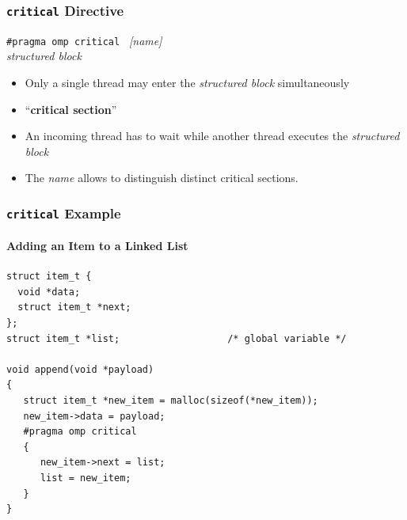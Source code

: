 \documentclass{beamer}
\begin{document}
\begin{frame}
  \frametitle{\texttt{critical} Directive} 

\begin{framed}
  {\tt \#pragma omp critical } {\it [name]}  \\
  {\it structured block} 
\end{framed}

\bigskip

\begin{itemize}
\item Only a single thread may enter the \textit{structured block} simultaneously

\item ``\textbf{critical section}''
    
\item An incoming thread has to wait while another thread executes the \textit{structured block}
  
\item The \textit{name} allows to distinguish distinct critical sections.
\end{itemize}
\end{frame}


\begin{frame}[fragile=singleslide]
  \frametitle{\texttt{critical} Example}
  \framesubtitle{Adding an Item to a Linked List}

\begin{verbatim}
struct item_t {
  void *data;
  struct item_t *next;
};
struct item_t *list;                   /* global variable */

void append(void *payload)
{
   struct item_t *new_item = malloc(sizeof(*new_item));
   new_item->data = payload;
   #pragma omp critical 
   {
      new_item->next = list;
      list = new_item;
   }
}
\end{verbatim}
\end{frame}

\end{document}
